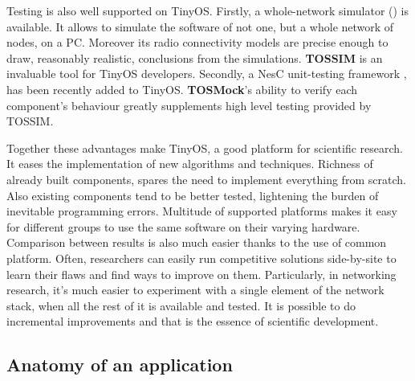 Testing is also well supported on TinyOS. Firstly, a whole-network
simulator (\cite{TOSSIM}) is available. It allows to simulate the
software of not one, but a whole network of nodes, on a PC. Moreover
its radio connectivity models are precise enough to draw, reasonably
realistic, conclusions from the simulations. {\bf TOSSIM} is an
invaluable tool for TinyOS developers. Secondly, a NesC unit-testing
framework \cite{TOSMock}, has been recently added to TinyOS. {\bf
TOSMock}'s ability to verify each component's behaviour greatly
supplements high level testing provided by TOSSIM.

Together these advantages make TinyOS, a good platform for scientific
research. It eases the implementation of new algorithms and
techniques.  Richness of already built components, spares the need to
implement everything from scratch.  Also existing components tend to
be better tested, lightening the burden of inevitable programming
errors.  Multitude of supported platforms makes it easy for different
groups to use the same software on their varying hardware.  Comparison
between results is also much easier thanks to the use of common
platform.  Often, researchers can easily run competitive solutions
side-by-site to learn their flaws and find ways to improve on them.
Particularly, in networking research, it's much easier to experiment
with a single element of the network stack, when all the rest of it is
available and tested. It is possible to do incremental improvements
and that is the essence of scientific development.

\subsection{Anatomy of an application}

